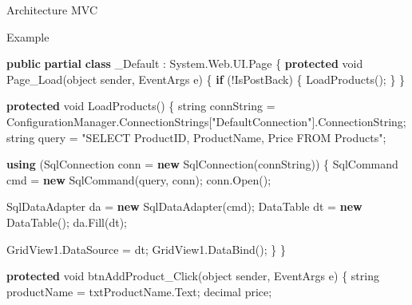 \documentclass[
  ignorenonframetext,
]{beamer}
\newenvironment{Shaded}{\begin{snugshade}}{\end{snugshade}}
\newcommand{\DataTypeTok}[1]{\textcolor[rgb]{0.68,0.00,0.00}{#1}}
\newcommand{\FunctionTok}[1]{\textcolor[rgb]{0.28,0.35,0.67}{#1}}
\newcommand{\KeywordTok}[1]{\textcolor[rgb]{0.00,0.23,0.31}{\textbf{#1}}}
\newcommand{\NormalTok}[1]{\textcolor[rgb]{0.00,0.23,0.31}{#1}}
\newcommand{\OperatorTok}[1]{\textcolor[rgb]{0.37,0.37,0.37}{#1}}
\newcommand{\StringTok}[1]{\textcolor[rgb]{0.13,0.47,0.30}{#1}}
\begin{document}
\begin{frame}[fragile]{Architecture MVC}
\begin{block}{Example}
\begin{Shaded}
\begin{Highlighting}[]
\KeywordTok{public} \KeywordTok{partial} \KeywordTok{class}\NormalTok{ \_Default }\OperatorTok{:}\NormalTok{ System}\OperatorTok{.}\FunctionTok{Web}\OperatorTok{.}\FunctionTok{UI}\OperatorTok{.}\FunctionTok{Page}
\OperatorTok{\{}
    \KeywordTok{protected} \DataTypeTok{void} \FunctionTok{Page\_Load}\OperatorTok{(}\DataTypeTok{object}\NormalTok{ sender}\OperatorTok{,}\NormalTok{ EventArgs e}\OperatorTok{)}
    \OperatorTok{\{}
        \KeywordTok{if} \OperatorTok{(!}\NormalTok{IsPostBack}\OperatorTok{)}
        \OperatorTok{\{}
            \FunctionTok{LoadProducts}\OperatorTok{();}
        \OperatorTok{\}}
    \OperatorTok{\}}

    \KeywordTok{protected} \DataTypeTok{void} \FunctionTok{LoadProducts}\OperatorTok{()}
    \OperatorTok{\{}
        \DataTypeTok{string}\NormalTok{ connString }\OperatorTok{=}\NormalTok{ ConfigurationManager}\OperatorTok{.}\FunctionTok{ConnectionStrings}\OperatorTok{[}\StringTok{"DefaultConnection"}\OperatorTok{].}\FunctionTok{ConnectionString}\OperatorTok{;}
        \DataTypeTok{string}\NormalTok{ query }\OperatorTok{=} \StringTok{"SELECT ProductID, ProductName, Price FROM Products"}\OperatorTok{;}

        \KeywordTok{using} \OperatorTok{(}\NormalTok{SqlConnection conn }\OperatorTok{=} \KeywordTok{new} \FunctionTok{SqlConnection}\OperatorTok{(}\NormalTok{connString}\OperatorTok{))}
        \OperatorTok{\{}
\NormalTok{            SqlCommand cmd }\OperatorTok{=} \KeywordTok{new} \FunctionTok{SqlCommand}\OperatorTok{(}\NormalTok{query}\OperatorTok{,}\NormalTok{ conn}\OperatorTok{);}
\NormalTok{            conn}\OperatorTok{.}\FunctionTok{Open}\OperatorTok{();}

\NormalTok{            SqlDataAdapter da }\OperatorTok{=} \KeywordTok{new} \FunctionTok{SqlDataAdapter}\OperatorTok{(}\NormalTok{cmd}\OperatorTok{);}
\NormalTok{            DataTable dt }\OperatorTok{=} \KeywordTok{new} \FunctionTok{DataTable}\OperatorTok{();}
\NormalTok{            da}\OperatorTok{.}\FunctionTok{Fill}\OperatorTok{(}\NormalTok{dt}\OperatorTok{);}

\NormalTok{            GridView1}\OperatorTok{.}\FunctionTok{DataSource} \OperatorTok{=}\NormalTok{ dt}\OperatorTok{;}
\NormalTok{            GridView1}\OperatorTok{.}\FunctionTok{DataBind}\OperatorTok{();}
        \OperatorTok{\}}
    \OperatorTok{\}}

    \KeywordTok{protected} \DataTypeTok{void} \FunctionTok{btnAddProduct\_Click}\OperatorTok{(}\DataTypeTok{object}\NormalTok{ sender}\OperatorTok{,}\NormalTok{ EventArgs e}\OperatorTok{)}
    \OperatorTok{\{}
        \DataTypeTok{string}\NormalTok{ productName }\OperatorTok{=}\NormalTok{ txtProductName}\OperatorTok{.}\FunctionTok{Text}\OperatorTok{;}
        \DataTypeTok{decimal}\NormalTok{ price}\OperatorTok{;}


\end{Highlighting}
\end{Shaded}
\end{block}
\end{frame}
\end{document}
